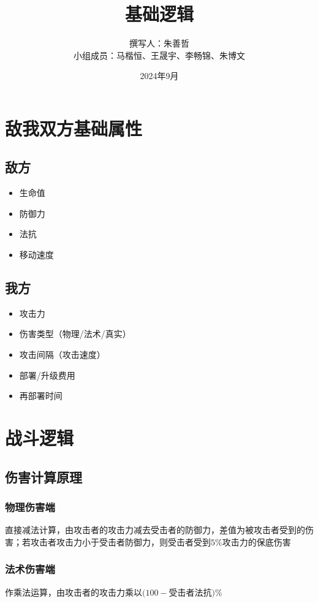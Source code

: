 \documentclass[a4paper, 12pt]{article}
\begin{document}
	\title{基础逻辑}
	\author{撰写人：朱善哲\\小组成员：马楷恒、王晟宇、李畅锦、朱博文}
	\date{2024年9月}
	\maketitle
	\section{敌我双方基础属性}
		\subsection{敌方}
			\begin{itemize}
				\item 生命值
				\item 防御力
				\item 法抗
				\item 移动速度
			\end{itemize}
		\subsection{我方}
			\begin{itemize}
				\item 攻击力
				\item 伤害类型（物理/法术/真实）
				\item 攻击间隔（攻击速度）
				\item 部署/升级费用
				\item 再部署时间
			\end{itemize}
	\section{战斗逻辑}
		\subsection{伤害计算原理}
			\subsubsection{物理伤害端}
				直接减法计算，由攻击者的攻击力减去受击者的防御力，差值为被攻击者受到的伤害；若攻击者攻击力小于受击者防御力，则受击者受到$5\%$攻击力的保底伤害
			\subsubsection{法术伤害端}
				作乘法运算，由攻击者的攻击力乘以$(100-$受击者法抗$)\%$
\end{document}
